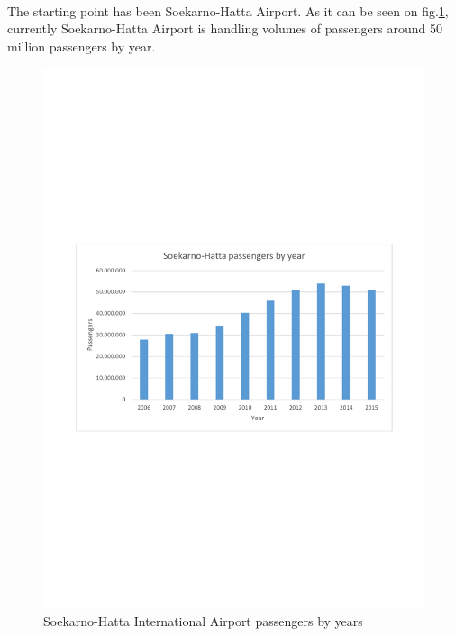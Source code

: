 \paragraph{} The starting point has been Soekarno-Hatta Airport. As it can be seen on fig.\ref{paxYears}, currently Soekarno-Hatta Airport is handling volumes of passengers around 50 million passengers by year.

\begin{figure}[H]
	\centering
	\includegraphics[clip, trim=2cm 10cm 2cm 10cm, width=1\textwidth]{./images/PROGNOSIS/paxYears}
	\caption{Soekarno-Hatta International Airport passengers by years }
	\label{paxYears}
\end{figure}	

